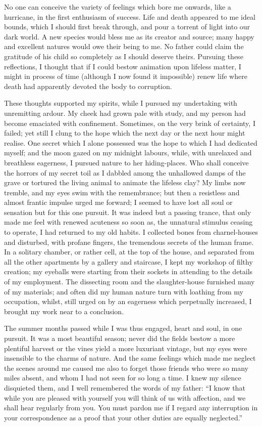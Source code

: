 \documentclass[12pt,openright]{book}
\begin{document}
No one can conceive the variety of feelings which bore me onwards, like a hurricane, in the first enthusiasm of success. Life and death appeared to me ideal bounds, which I should first break through, and pour a torrent of light into our dark world. A new species would bless me as its creator and source; many happy and excellent natures would owe their being to me. No father could claim the gratitude of his child so completely as I should deserve theirs. Pursuing these reflections, I thought that if I could bestow animation upon lifeless matter, I might in process of time (although I now found it impossible) renew life where death had apparently devoted the body to corruption.

These thoughts supported my spirits, while I pursued my undertaking with unremitting ardour. My cheek had grown pale with study, and my person had become emaciated with confinement. Sometimes, on the very brink of certainty, I failed; yet still I clung to the hope which the next day or the next hour might realise. One secret which I alone possessed was the hope to which I had dedicated myself; and the moon gazed on my midnight labours, while, with unrelaxed and breathless eagerness, I pursued nature to her hiding-places. Who shall conceive the horrors of my secret toil as I dabbled among the unhallowed damps of the grave or tortured the living animal to animate the lifeless clay? My limbs now tremble, and my eyes swim with the remembrance; but then a resistless and almost frantic impulse urged me forward; I seemed to have lost all soul or sensation but for this one pursuit. It was indeed but a passing trance, that only made me feel with renewed acuteness so soon as, the unnatural stimulus ceasing to operate, I had returned to my old habits. I collected bones from charnel-houses and disturbed, with profane fingers, the tremendous secrets of the human frame. In a solitary chamber, or rather cell, at the top of the house, and separated from all the other apartments by a gallery and staircase, I kept my workshop of filthy creation; my eyeballs were starting from their sockets in attending to the details of my employment. The dissecting room and the slaughter-house furnished many of my materials; and often did my human nature turn with loathing from my occupation, whilst, still urged on by an eagerness which perpetually increased, I brought my work near to a conclusion.

The summer months passed while I was thus engaged, heart and soul, in one pursuit. It was a most beautiful season; never did the fields bestow a more plentiful harvest or the vines yield a more luxuriant vintage, but my eyes were insensible to the charms of nature. And the same feelings which made me neglect the scenes around me caused me also to forget those friends who were so many miles absent, and whom I had not seen for so long a time. I knew my silence disquieted them, and I well remembered the words of my father: “I know that while you are pleased with yourself you will think of us with affection, and we shall hear regularly from you. You must pardon me if I regard any interruption in your correspondence as a proof that your other duties are equally neglected.”
\end{document}
